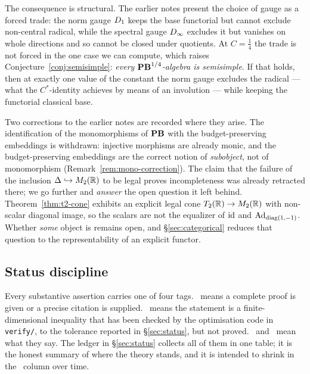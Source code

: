The consequence is structural.  The earlier notes present the choice of gauge as
a forced trade: the norm gauge $D_1$ keeps the base functorial but cannot
exclude non-central radical, while the spectral gauge $D_\infty$ excludes it
but vanishes on whole directions and so cannot be closed under quotients.  At
$C=\tfrac14$ the trade is not forced in the one case we can compute, which
raises Conjecture~\ref{conj:semisimple}: \emph{every $\mathbf{PB}^{1/4}$-algebra is
semisimple}.  If that holds, then at exactly one value of the constant the norm
gauge excludes the radical --- what the $C^*$-identity achieves by means of an
involution --- while keeping the functorial classical base.

Two corrections to the earlier notes are recorded where they arise.  The
identification of the monomorphisms of $\mathbf{PB}$ with the budget-preserving
embeddings is withdrawn: injective morphisms are already monic, and the
budget-preserving embeddings are the correct notion of \emph{subobject}, not of
monomorphism (Remark~\ref{rem:mono-correction}).  The claim that the failure of
the inclusion $\Delta\hookrightarrow M_2(\mathbb{R})$ to be legal proves incompleteness
was already retracted there; we go further and \emph{answer} the open question
it left behind.  Theorem~\ref{thm:t2-cone} exhibits an explicit legal cone
$T_2(\mathbb{R})\to M_2(\mathbb{R})$ with non-scalar diagonal image, so the scalars are not
the equalizer of $\operatorname{id}$ and $\operatorname{Ad}_{\operatorname{diag}(1,-1)}$.  Whether
\emph{some} object is remains open, and \S\ref{sec:categorical} reduces that
question to the representability of an explicit functor.

\subsection{Status discipline}

Every substantive assertion carries one of four tags.  \statusproved\ means a
complete proof is given or a precise citation is supplied.  \statusnum\ means
the statement is a finite-dimensional inequality that has been checked by the
optimisation code in \texttt{verify/}, to the tolerance reported in
\S\ref{sec:status}, but not proved.  \statusconj\ and \statusopen\ mean what they
say.  The ledger in \S\ref{sec:status} collects all of them in one table; it is
the honest summary of where the theory stands, and it is intended to shrink in
the \statusopen\ column over time.
